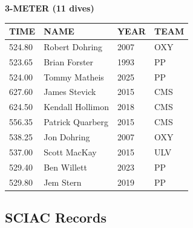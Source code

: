 \begin{table}[H]
\centering
\begin{minipage}[t]{0.6\textwidth}
\centering
\textbf{3-METER (11 dives)}\\[0.1cm]
\begin{tabular}{@{}p{1.8cm}p{2.8cm}p{1.2cm}p{1.4cm}@{}}
\hline
    \textbf{TIME} & \textbf{NAME} & \textbf{YEAR} & \textbf{TEAM} \\
\hline
    524.80 & Robert Dohring & 2007 & OXY \\
    523.65 & Brian Forster & 1993 & PP \\
    524.00 & Tommy Matheis & 2025 & PP \\
    627.60 & James Stevick & 2015 & CMS \\
    624.50 & Kendall Hollimon & 2018 & CMS \\
    556.35 & Patrick Quarberg & 2015 & CMS \\
    538.25 & Jon Dohring & 2007 & OXY \\
    537.00 & Scott MacKay & 2015 & ULV \\
    529.40 & Ben Willett & 2023 & PP \\
    529.80 & Jem Stern & 2019 & PP \\
\hline
\end{tabular}
\end{minipage}
\end{table}


\newpage



\subsection{SCIAC Records}

